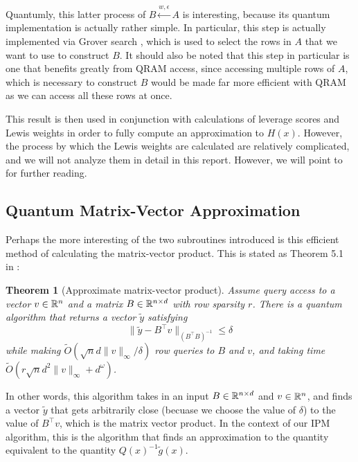 \documentclass[11pt]{article}
\newtheorem{theorem}{Theorem}
\begin{document}
Quantumly, this latter process of \( B \overset{w, \epsilon}{\leftarrow} A \) is interesting, because its quantum 
implementation is actually rather simple. In particular, this step is actually implemented via Grover search 
\cite{apersQuantumSpeedupGraph2023}, which 
is used to select the rows in \( A \) that we want to use to construct \( B \). It should also be noted that 
this step in particular is one that benefits greatly from QRAM access, since accessing multiple rows of \( A \), which 
is necessary to construct \( B \) would be made far more efficient with QRAM as we can access all these rows 
at once.  
 
This result is then used in conjunction with calculations of leverage scores and Lewis weights in order to 
fully compute an approximation to \( H(x) \). However, the process by which the Lewis weights 
are calculated are relatively complicated, and we will not analyze them in detail in this report. However, 
we will point to \cite{apersQuantumSpeedupsLinear2024} for further reading.  

\subsection{Quantum Matrix-Vector Approximation} 
Perhaps the more interesting of the two subroutines introduced is this efficient method of calculating 
the matrix-vector product. This is stated as Theorem 5.1 in \cite{apersQuantumSpeedupsLinear2024}:

\begin{theorem}[Approximate matrix-vector product]
	Assume query access to a vector \( v \in \mathbb R^{n} \) and a matrix \( B \in \mathbb R^{n \times d} \) with 
	row sparsity \( r \). There is a quantum algorithm that returns a vector \( \tilde y \) satisfying 
	\[
		\|\tilde y - B^{\top} v\|_{(B^{\top} B)^{-1}} \le  \delta
	\] 
	while making \( \widetilde O(\sqrt{n} d \|v\|_{\infty} / \delta) \) row queries to \( B \) and \( v \), and 
	taking time \( \widetilde O(r \sqrt{n} d^2 \|v\|_{\infty} + d^{\omega}) \).
\end{theorem}
In other words, this algorithm takes in an input \( B\in \mathbb R^{n \times d} \)	and \( v \in \mathbb R^{n} \), and 
finds a vector \( \tilde y \) that gets arbitrarily close (becuase we 
choose the value of \( \delta \)) to the value of \( B^{\top} v \), which is the matrix vector product. In the 
context of our IPM algorithm, this is the algorithm that finds an approximation to the quantity equivalent 
to the quantity \( Q(x)^{-1}\tilde g(x) \). 
\end{document}
